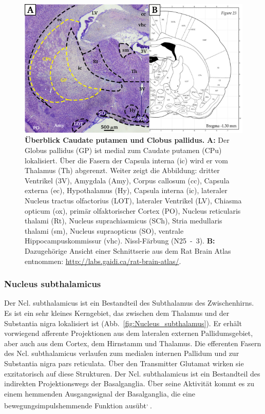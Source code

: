 \documentclass[12pt,a4paper,pdftex]{article}
\begin{document}
\begin{figure}[H]
    \centering
    \includegraphics{pictures/Basalganglia/GP_CPu.png}
    \caption[Überblick Caudate putamen und Globus pallidus]{\textbf{Überblick Caudate putamen und Clobus pallidus.} \textbf{A:} Der Globus pallidus (GP) ist medial zum Caudate putamen (CPu) lokalisiert. Über die Fasern der Capsula interna (ic) wird er vom Thalamus (Th) abgerenzt. Weiter zeigt die Abbildung: dritter Ventrikel (3V), Amygdala (Amy), Corpus callosum (cc), Capsula externa (ec), Hypothalamus (Hy), Capsula interna (ic), lateraler Nucleus tractus olfactorius (LOT), lateraler Ventrikel (LV), Chiasma opticum (ox), primär olfaktorischer Cortex (PO),  Nucleus reticularis thalami (Rt), Nucleus suprachiasmicus (SCh), Stria medullaris thalami (sm), Nucleus supraopticus (SO), ventrale Hippocampuskommissur (vhc). Nissl-Färbung (N25~-~3). \textbf{B:} Dazugehörige Ansicht einer Schnittserie aus dem Rat Brain Atlas entnommen: \url{http://labs.gaidi.ca/rat-brain-atlas/}.}
    \label{fig:GP_CPu}
\end{figure}

\subsubsection*{Nucleus subthalamicus} 
Der Ncl. subthalamicus ist ein Bestandteil des Subthalamus des Zwischenhirns. Es ist ein sehr kleines Kerngebiet, das zwischen dem Thalamus und der Substantia nigra lokalisiert ist (Abb.~\ref{fig:Nucleus_subthalamus}). Er erhält vorwiegend afferente Projektionen aus dem lateralen externen Pallidumsgebiet, aber auch aus dem Cortex, dem Hirnstamm und Thalamus. Die efferenten Fasern des Ncl. subthalamicus verlaufen zum medialen internen Pallidum und zur Substantia nigra pars reticulata. Über den Transmitter Glutamat wirken sie exzitatorisch auf diese Strukturen. Der Ncl. subthalamicus ist ein Bestandteil des indirekten Projektionswegs der Basalganglia. Über seine Aktivität kommt es zu einem hemmenden Ausgangssignal der Basalganglia, die eine bewegungsimpulshemmende Funktion ausübt\textsuperscript{\cite[43]{kandel2013principles}, \cite[9]{trepel2011neuroanatomie}}.   
\end{document}
